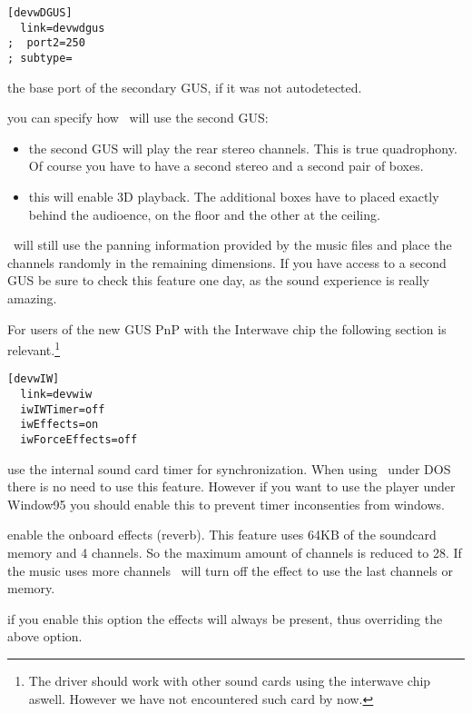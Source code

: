 \begin{verbatim}
[devwDGUS]
  link=devwdgus
;  port2=250
; subtype=
\end{verbatim}
\begin{dojlist}
\item[port2] the base port of the secondary GUS, if it was not autodetected.
\item[subtype] you can specify how \cp\ will use the second GUS:
  \begin{itemize}
  \item[0] the second GUS will play the rear stereo channels. This is true
  quadrophony. Of course you have to have a second stereo and a second pair
  of boxes.
  \item[1] this will enable 3D playback. The additional boxes have to placed
  exactly behind the audioence, on the floor and the other at the ceiling.
  \end{itemize}
\end{dojlist}
\cp\ will still use the panning information provided by the music files and
place the channels randomly in the remaining dimensions. If you have
access to a second GUS be sure to check this feature one day, as the
sound experience is really amazing.

For users of the new GUS PnP with the Interwave chip the following
section is relevant.\footnote{The driver should work with other sound
cards using the interwave chip aswell. However we have not encountered
such card by now.}
\begin{verbatim}
[devwIW]
  link=devwiw
  iwIWTimer=off     
  iwEffects=on       
  iwForceEffects=off
\end{verbatim}
\begin{dojlist}
\item[iwIWTimer] use the internal sound card timer for synchronization. When
using \cp\ under DOS there is no need to use this feature. However if
you want to use the player under Window95 you should enable this to
prevent timer inconsenties from windows.
\item[iwEffects] enable the onboard effects (reverb). This feature uses 64KB of
the soundcard memory and 4 channels. So the maximum amount of channels
is reduced to 28. If the music uses more channels \cp\ will turn off
the effect to use the last channels or memory.
\item[iwForceEffects] if you enable this option the effects will always be
present, thus overriding the above option.
\end{dojlist}

